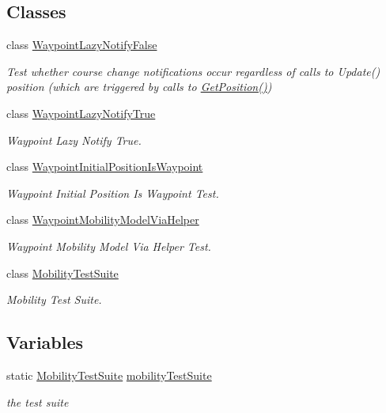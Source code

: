 \subsection*{Classes}
\begin{DoxyCompactItemize}
\item 
class \hyperlink{classWaypointLazyNotifyFalse}{Waypoint\+Lazy\+Notify\+False}
\begin{DoxyCompactList}\small\item\em Test whether course change notifications occur regardless of calls to Update() position (which are triggered by calls to \hyperlink{lena-cqi-threshold_8cc_acebf763e1a0478cec225f9547941ae54}{Get\+Position()}) \end{DoxyCompactList}\item 
class \hyperlink{classWaypointLazyNotifyTrue}{Waypoint\+Lazy\+Notify\+True}
\begin{DoxyCompactList}\small\item\em Waypoint Lazy Notify True. \end{DoxyCompactList}\item 
class \hyperlink{classWaypointInitialPositionIsWaypoint}{Waypoint\+Initial\+Position\+Is\+Waypoint}
\begin{DoxyCompactList}\small\item\em Waypoint Initial Position Is Waypoint Test. \end{DoxyCompactList}\item 
class \hyperlink{classWaypointMobilityModelViaHelper}{Waypoint\+Mobility\+Model\+Via\+Helper}
\begin{DoxyCompactList}\small\item\em Waypoint Mobility Model Via Helper Test. \end{DoxyCompactList}\item 
class \hyperlink{classMobilityTestSuite}{Mobility\+Test\+Suite}
\begin{DoxyCompactList}\small\item\em Mobility Test Suite. \end{DoxyCompactList}\end{DoxyCompactItemize}
\subsection*{Variables}
\begin{DoxyCompactItemize}
\item 
static \hyperlink{classMobilityTestSuite}{Mobility\+Test\+Suite} \hyperlink{mobility-test-suite_8cc_a914d67a53365b47d49070af151e56f15}{mobility\+Test\+Suite}
\begin{DoxyCompactList}\small\item\em the test suite \end{DoxyCompactList}\end{DoxyCompactItemize}


